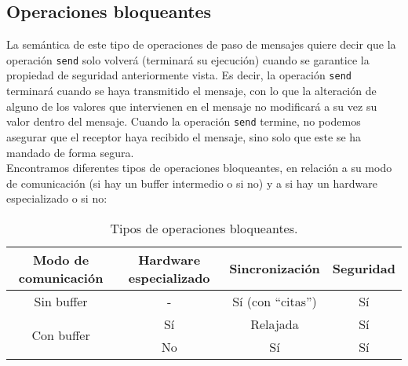 \subsection{Operaciones bloqueantes}
La semántica de este tipo de operaciones de paso de mensajes quiere decir que la operación \verb|send| solo volverá (terminará su ejecución) cuando se garantice la propiedad de seguridad anteriormente vista. Es decir, la operación \verb|send| terminará cuando se haya transmitido el mensaje, con lo que la alteración de alguno de los valores que intervienen en el mensaje no modificará a su vez su valor dentro del mensaje. Cuando la operación \verb|send| termine, no podemos asegurar que el receptor haya recibido el mensaje, sino solo que este se ha mandado de forma segura.\\

Encontramos diferentes tipos de operaciones bloqueantes, en relación a su modo de comunicación (si hay un buffer intermedio o si no) y a si hay un hardware especializado o si no:
\begin{table}[H]
\centering
\begin{tabular}{|c|c|c|c|}
    \hline
    Modo de comunicación & Hardware especializado & Sincronización & Seguridad \\
    \hline
    Sin buffer & - & Sí (con ``citas'') & Sí \\
    \hline
    \multirow{2}{*}{Con buffer} & Sí & Relajada & Sí \\
    \cline{2-4}
    & No & Sí & Sí \\
    \hline
\end{tabular}
\caption{Tipos de operaciones bloqueantes.}
\end{table}

